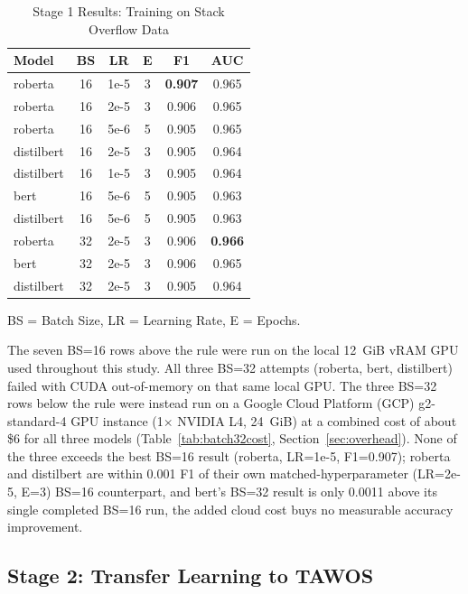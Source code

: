 \documentclass[preprint,12pt]{elsarticle}
\begin{document}
\begin{table}[t]
\centering
\caption{Stage 1 Results: Training on Stack Overflow Data}
\label{tab:stage1}
\begin{tabular}{lccccc}
\toprule
\textbf{Model} & \textbf{BS} & \textbf{LR} & \textbf{E} & \textbf{F1} & \textbf{AUC} \\
\midrule
roberta & 16 & 1e-5 & 3 & \textbf{0.907} & 0.965 \\
roberta & 16 & 2e-5 & 3 & 0.906 & 0.965 \\
roberta & 16 & 5e-6 & 5 & 0.905 & 0.965 \\
distilbert & 16 & 2e-5 & 3 & 0.905 & 0.964 \\
distilbert & 16 & 1e-5 & 3 & 0.905 & 0.964 \\
bert & 16 & 5e-6 & 5 & 0.905 & 0.963 \\
distilbert & 16 & 5e-6 & 5 & 0.905 & 0.963 \\
\midrule
roberta & 32 & 2e-5 & 3 & 0.906 & \textbf{0.966} \\
bert & 32 & 2e-5 & 3 & 0.906 & 0.965 \\
distilbert & 32 & 2e-5 & 3 & 0.905 & 0.964 \\
\bottomrule
\end{tabular}
\begin{center}
\footnotesize BS = Batch Size, LR = Learning Rate, E = Epochs. 
\end{center}
\end{table}

The seven BS=16 rows above the rule were run on the local 12~GiB vRAM GPU used throughout this study. All three BS=32 attempts (roberta, bert, distilbert) failed with CUDA out-of-memory on that same local GPU. The three BS=32 rows below the rule were instead run on a Google Cloud Platform (GCP) g2-standard-4 GPU instance (1$\times$ NVIDIA L4, 24~GiB) at a combined cost of about \$6 for all three models (Table~\ref{tab:batch32cost}, Section~\ref{sec:overhead}). None of the three exceeds the best BS=16 result (roberta, LR=1e-5, F1=0.907); roberta and distilbert are within 0.001 F1 of their own matched-hyperparameter (LR=2e-5, E=3) BS=16 counterpart, and bert's BS=32 result is only 0.0011 above its single completed BS=16 run, the added cloud cost buys no measurable accuracy improvement.

\subsection{Stage 2: Transfer Learning to TAWOS}
\end{document}
